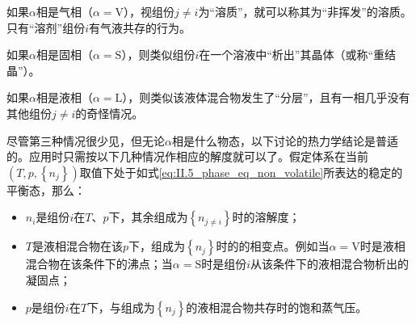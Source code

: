\documentclass[main.tex]{subfiles}
\begin{document}
如果$\alpha$相是气相（$\alpha=\text{V}$），视组份$j\neq i$为“溶质”，就可以称其为“非挥发”的溶质。只有“溶剂”组份$i$有气液共存的行为。

如果$\alpha$相是固相（$\alpha=\text{S}$），则类似组份$i$在一个溶液中“析出”其晶体（或称“重结晶”）。

如果$\alpha$相是液相（$\alpha=\text{L}$），则类似该液体混合物发生了“分层”，且有一相几乎没有其他组份$j\neq i$的奇怪情况。

尽管第三种情况很少见，但无论$\alpha$相是什么物态，以下讨论的热力学结论是普适的。应用时只需按以下几种情况作相应的解度就可以了。假定体系在当前$\left(T,p,\left\{n_j\right\}\right)$取值下处于如式\eqref{eq:II.5_phase_eq_non_volatile}所表达的稳定的平衡态，那么：
\begin{itemize}
    \item $n_i$是组份$i$在$T$、$p$下，其余组成为$\left\{n_{j\neq i}\right\}$时的溶解度；
    \item $T$是液相混合物在该$p$下，组成为$\left\{n_j\right\}$时的的相变点。例如当$\alpha=\text{V}$时是液相混合物在该条件下的沸点；当$\alpha=\text{S}$时是组份$i$从该条件下的液相混合物析出的凝固点；
    \item $p$是组份$i$在$T$下，与组成为$\left\{n_j\right\}$的液相混合物共存时的饱和蒸气压。
\end{itemize}
\end{document}
